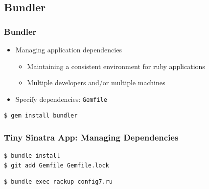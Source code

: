 \documentclass{beamer}
\begin{document}
\subsection{Bundler}
\begin{frame}[fragile]\frametitle{Bundler}

  \begin{itemize}
    \item Managing application dependencies
    \begin{itemize}
      \item Maintaining a consistent environment for ruby applications
      \item Multiple developers and/or multiple machines
    \end{itemize}
    
    \item Specify dependencies: \texttt{Gemfile}
  \end{itemize}
  
  \begin{lstlisting}[language=bash, escapechar={^}]
$ gem install bundler
  \end{lstlisting}
  
\end{frame}



\begin{frame}[fragile]\frametitle{Tiny Sinatra App: Managing Dependencies}

  

  \begin{lstlisting}[language=bash, escapechar={^}]
$ bundle install
$ git add Gemfile Gemfile.lock
  \end{lstlisting}
  
  

  \begin{lstlisting}[language=bash, escapechar={^}]
$ bundle exec rackup config7.ru
  \end{lstlisting}
  
\end{frame}
\end{document}
